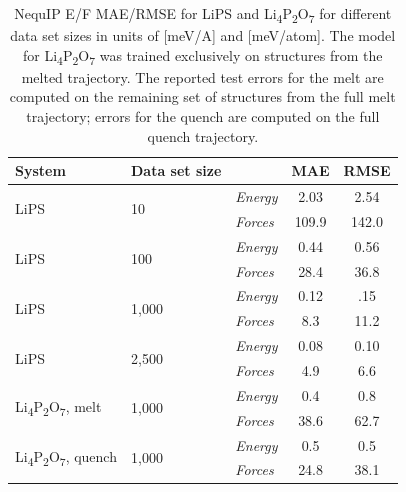\documentclass[%
reprint,
superscriptaddress,
nofootinbib,
amsmath,amssymb,
aps,
prl,
]{revtex4-1}
\begin{document}
\begin{table}[!htbp]
\centering
\begin{tabular}{lllcc}
\hline \hline
System & Data set size &  & MAE & RMSE \\
\hline
\multirow{2}{*}{LiPS}  & \multirow{2}{*}{10}  & \textit{Energy} & 2.03 &  2.54 \\ 
                          & & \textit{Forces}  & 109.9 & 142.0 \\ \hline

\multirow{2}{*}{LiPS}  & \multirow{2}{*}{100}  & \textit{Energy} & 0.44 & 0.56  \\ 
                          & & \textit{Forces}  & 28.4 & 36.8 \\ \hline
                          
\multirow{2}{*}{LiPS}  & \multirow{2}{*}{1,000}  & \textit{Energy} &  0.12 & .15 \\ 
                          & & \textit{Forces}  & 8.3 & 11.2 \\ \hline
                          
\multirow{2}{*}{LiPS}  & \multirow{2}{*}{2,500}  & \textit{Energy} & 0.08 & 0.10 \\ 
                          & & \textit{Forces}  & 4.9 & 6.6 \\ \hline \hline

\multirow{2}{*}{Li\textsubscript{4}P\textsubscript{2}O\textsubscript{7}, melt}  & \multirow{2}{*}{1,000}  & \textit{Energy} & 0.4 & 0.8 \\ 
                          & & \textit{Forces}  & 38.6 & 62.7 \\ \hline
                          
\multirow{2}{*}{Li\textsubscript{4}P\textsubscript{2}O\textsubscript{7}, quench}  & \multirow{2}{*}{1,000}  & \textit{Energy} & 0.5 & 0.5 \\ 
                          & & \textit{Forces}  & 24.8  & 38.1\\ \hline
                                       
  \hline \hline
    \end{tabular}
    \caption{NequIP E/F MAE/RMSE for LiPS and Li\textsubscript{4}P\textsubscript{2}O\textsubscript{7} for different data set sizes in units of [meV/A] and [meV/atom]. The model for Li\textsubscript{4}P\textsubscript{2}O\textsubscript{7} was trained exclusively on structures from the melted trajectory. The reported test errors for the melt are computed on the remaining set of structures from the full melt trajectory;  errors for the quench are computed on the full quench trajectory. }
    \label{tab:lps}
\end{table}
\end{document}
